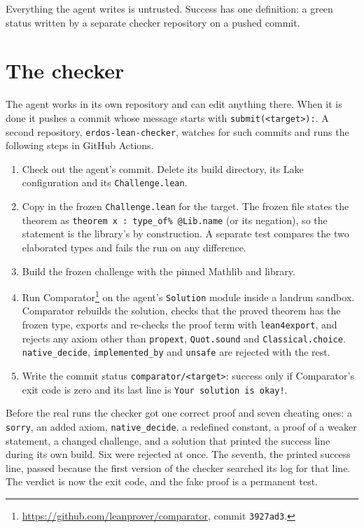 \documentclass[11pt]{article}
\begin{document}
Everything the agent writes is untrusted.
Success has one definition: a green status written by a separate checker repository on a pushed commit.

\section{The checker}

The agent works in its own repository and can edit anything there.
When it is done it pushes a commit whose message starts with \texttt{submit(<target>):}.
A second repository, \texttt{erdos-lean-checker}, watches for such commits and runs the following steps in GitHub Actions.
\begin{enumerate}
\item Check out the agent's commit. Delete its build directory, its Lake configuration and its \texttt{Challenge.lean}.
\item Copy in the frozen \texttt{Challenge.lean} for the target. The frozen file states the theorem as \texttt{theorem x : type\_of\% @Lib.name} (or its negation), so the statement is the library's by construction. A separate test compares the two elaborated types and fails the run on any difference.
\item Build the frozen challenge with the pinned Mathlib and library.
\item Run Comparator\footnote{\url{https://github.com/leanprover/comparator}, commit \texttt{3927ad3}.} on the agent's \texttt{Solution} module inside a landrun sandbox. Comparator rebuilds the solution, checks that the proved theorem has the frozen type, exports and re-checks the proof term with \texttt{lean4export}, and rejects any axiom other than \texttt{propext}, \texttt{Quot.sound} and \texttt{Classical.choice}. \texttt{native\_decide}, \texttt{implemented\_by} and \texttt{unsafe} are rejected with the rest.
\item Write the commit status \texttt{comparator/<target>}: success only if Comparator's exit code is zero and its last line is \texttt{Your solution is okay!}.
\end{enumerate}
Before the real runs the checker got one correct proof and seven cheating ones: a \texttt{sorry}, an added axiom, \texttt{native\_decide}, a redefined constant, a proof of a weaker statement, a changed challenge, and a solution that printed the success line during its own build.
Six were rejected at once.
The seventh, the printed success line, passed because the first version of the checker searched its log for that line.
The verdict is now the exit code, and the fake proof is a permanent test.
\end{document}
